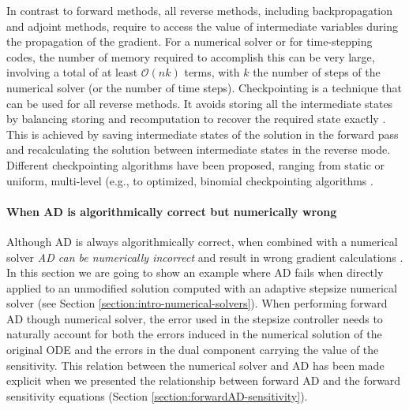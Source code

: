In contrast to forward methods, all reverse methods, including backpropagation and adjoint methods, require to access the value of intermediate variables during the propagation of the gradient. 
For a numerical solver or for time-stepping codes, the number of memory required to accomplish this can be very large, involving a total of at least $\mathcal O(nk)$ terms, with $k$ the number of steps of the numerical solver (or the number of time steps). 
Checkpointing is a technique that can be used for all reverse methods. 
It avoids storing all the intermediate states by balancing  storing and recomputation to recover the required state exactly \cite{Griewank:2008kh}.
This is achieved by saving intermediate states of the solution in the forward pass and recalculating the solution between intermediate states in the reverse mode. 
Different checkpointing algorithms have been proposed, ranging from static or uniform, multi-level (e.g., \cite{Giering:1998in,Heimbach.2005} to optimized, binomial checkpointing algorithms  \cite{Griewank.2000,Walther.2004,Bockhorn.2020,Checkpoiting_2023}.



\paragraph{When AD is algorithmically correct but numerically wrong}
\label{section:AD-incorrect}


Although AD is always algorithmically correct, when combined with a numerical solver \textit{AD can be numerically incorrect} and result in wrong gradient calculations \cite{Eberhard_Bischof_1996}. 
In this section we are going to show an example where AD fails when directly applied to an unmodified solution computed with an adaptive stepsize numerical solver (see Section \ref{section:intro-numerical-solvers}).
When performing forward AD though numerical solver, the error used in the stepsize controller needs to naturally account for both the errors induced in the numerical solution of the original ODE and the errors in the dual component carrying the value of the sensitivity. 
This relation between the numerical solver and AD has been made explicit when we presented the relationship between forward AD and the forward sensitivity equations (Section \ref{section:forwardAD-sensitivity}). 

